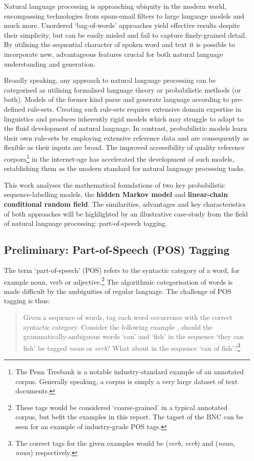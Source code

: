 \documentclass[../main.tex]{subfiles}
\begin{document}
Natural language processing is approaching ubiquity in the modern world, encompassing technologies from spam-email filters to large language models and much more.
Unordered `bag-of-words' approaches yield effective results despite their simplicity, but can be easily misled and fail to capture finely-grained detail.
By utilising the sequential character of spoken word and text it is possible to incorporate new, advantageous features crucial for both natural language understanding and generation.

Broadly speaking, any approach to natural language processing can be categorised as utilising formalised language theory or probabilistic methods (or both).
Models of the former kind parse and generate language according to pre-defined rule-sets. Creating such rule-sets requires extensive domain expertise in linguistics and produces inherently rigid models which may struggle to adapt to the fluid development of natural language.
In contrast, probabilistic models learn their own rule-sets by employing extensive reference data and are consequently as flexible as their inputs are broad. The improved accessibility of quality reference corpora\footnote{The Penn Treebank is a notable industry-standard example of an annotated corpus. Generally speaking, a corpus is simply a very large dataset of text documents.} in the internet-age has accelerated the development of such models, establishing them as the modern standard for natural language processing tasks.

This work analyses the mathematical foundations of two key probabilistic sequence-labelling models, the \textbf{hidden Markov model} and \textbf{linear-chain conditional random field}.
The similarities, advantages and key characteristics of both approaches will be highlighted by an illustrative case-study from the field of natural language processing: part-of-speech tagging.

\subsection{Preliminary: Part-of-Speech (POS) Tagging}

 The term `part-of-speech' (POS) refers to the syntactic category of a word, for example noun, verb or adjective.\footnote{These tags would be considered `coarse-grained' in a typical annotated corpus, but befit the examples in this report. The tagset of the BNC \autocite{bnc-corpus} can be seen for an example of industry-grade POS tags.}
 The algorithmic categorisation of words is made difficult by the ambiguities of regular language. The challenge of POS tagging is thus:
\begin{quote}
    Given a sequence of words, tag each word occurrence with the correct syntactic category. Consider the following example \autocite{eisenstein-nlp-2019}, should the grammatically-ambiguous words `can' and `fish' in the sequence `they can fish' be tagged \textit{noun} or \textit{verb}? What about in the sequence `can of fish'?\footnote{The correct tags for the given examples would be (\textit{verb}, \textit{verb}) and (\textit{noun}, \textit{noun}) respectively.}
\end{quote}
\end{document}
